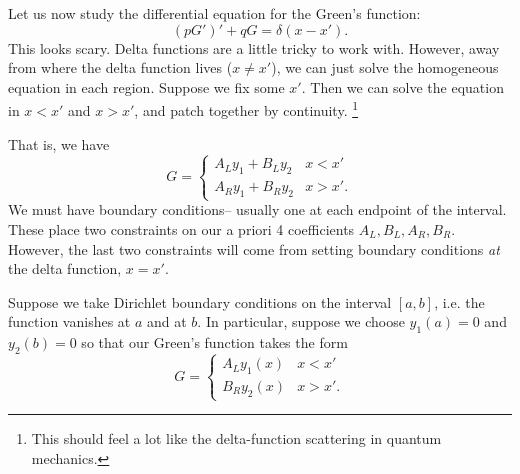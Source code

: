 Let us now study the differential equation for the Green's function:
\begin{equation}
    (pG')' + qG = \delta(x-x').
\end{equation}
This looks scary. Delta functions are a little tricky to work with. However, away from where the delta function lives ($x\neq x'$), we can just solve the homogeneous equation in each region. Suppose we fix some $x'$. Then we can solve the equation in $x<x'$ and $x>x'$, and patch together by continuity.%
    \footnote{This should feel a lot like the delta-function scattering in quantum mechanics.}

That is, we have
\begin{equation}
    G= \begin{cases}
        A_L y_1 + B_L y_2 & x < x'\\
        A_R y_1 + B_R y_2 & x > x'.
    \end{cases}
\end{equation}
We must have boundary conditions-- usually one at each endpoint of the interval. These place two constraints on our a priori 4 coefficients $A_L,B_L,A_R, B_R$. However, the last two constraints will come from setting boundary conditions \emph{at} the delta function, $x=x'$.

Suppose we take Dirichlet boundary conditions on the interval $[a,b]$, i.e. the function vanishes at $a$ and at $b$. In particular, suppose we choose $y_1(a)=0$ and $y_2(b)=0$ so that our Green's function takes the form
\begin{equation}
    G= \begin{cases}
        A_L y_1(x) & x < x'\\
        B_R y_2(x) & x > x'.
    \end{cases}
\end{equation}

